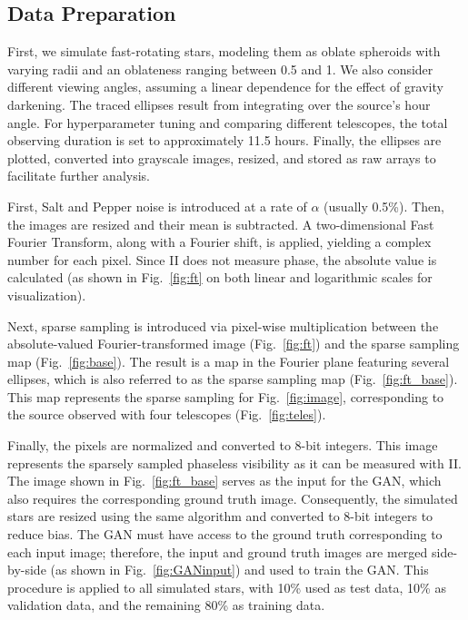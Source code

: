 \subsection{Data Preparation}
First, we simulate fast-rotating stars, modeling them as oblate spheroids with varying radii and an oblateness ranging between 0.5 and 1. We also consider different viewing angles, assuming a linear dependence for the effect of gravity darkening. The traced ellipses result from integrating over the source's hour angle. For hyperparameter tuning and comparing different telescopes, the total observing duration is set to approximately 11.5 hours. Finally, the ellipses are plotted, converted into grayscale images, resized, and stored as raw arrays to facilitate further analysis.

First, Salt and Pepper noise is introduced at a rate of \(\alpha\) (usually 0.5\%). Then, the images are resized and their mean is subtracted. A two-dimensional Fast Fourier Transform, along with a Fourier shift, is applied, yielding a complex number for each pixel. Since II does not measure phase, the absolute value is calculated (as shown in Fig.~\ref{fig:ft} on both linear and logarithmic scales for visualization). 

Next, sparse sampling is introduced via pixel-wise multiplication between the absolute-valued Fourier-transformed image (Fig.~\ref{fig:ft}) and the sparse sampling map (Fig.~\ref{fig:base}). The result is a map in the Fourier plane featuring several ellipses, which is also referred to as the sparse sampling map (Fig.~\ref{fig:ft_base}). This map represents the sparse sampling for Fig.~\ref{fig:image}, corresponding to the source observed with four telescopes (Fig.~\ref{fig:teles}). 

Finally, the pixels are normalized and converted to 8-bit integers. This image represents the sparsely sampled phaseless visibility as it can be measured with II. The image shown in Fig.~\ref{fig:ft_base} serves as the input for the GAN, which also requires the corresponding ground truth image. Consequently, the simulated stars are resized using the same algorithm and converted to 8-bit integers to reduce bias. The GAN must have access to the ground truth corresponding to each input image; therefore, the input and ground truth images are merged side-by-side (as shown in Fig.~\ref{fig:GANinput}) and used to train the GAN. This procedure is applied to all simulated stars, with 10\% used as test data, 10\% as validation data, and the remaining 80\% as training data.


